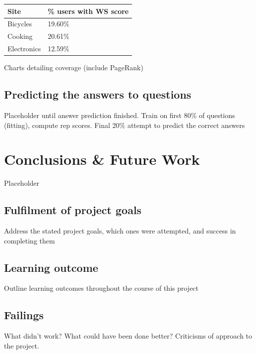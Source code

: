 \documentclass[]{final_report}
\begin{document}
\begin{minipage}{\linewidth}
\centering
\begin{tabular}{|l|l|}
\hline \textbf{Site} & \textbf{\% users with WS score} \\ 
\hline Bicycles & 19.60\% \\ 
\hline Cooking & 20.61\% \\ 
\hline Electronics & 12.59\% \\ 
\hline 
\end{tabular}\par
{} \label{tab:coverage}
\end{minipage}

Charts detailing coverage (include PageRank)

\section{Predicting the answers to questions}

Placeholder until answer prediction finished. Train on first 80\% of questions (fitting), compute rep scores. Final 20\% attempt to predict the correct answers 

\chapter{Conclusions \& Future Work}

Placeholder

\section{Fulfilment of project goals}

Address the stated project goals, which ones were attempted, and success in completing them

\section{Learning outcome}

Outline learning outcomes throughout the course of this project

\section{Failings}

What didn't work? What could have been done better? Criticisms of approach to the project.
\end{document}
